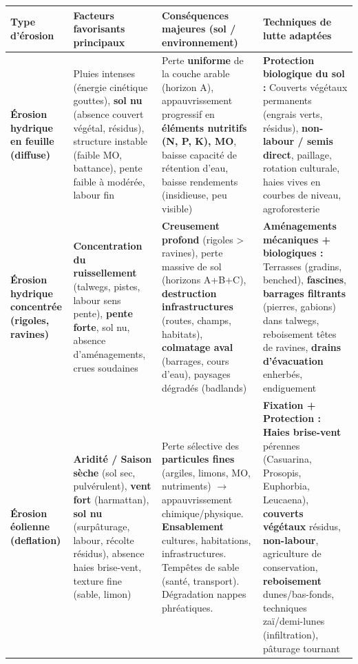 \documentclass[11pt]{article}
\begin{document}
\begin{corrige}
\begin{center}
\begin{tabularx}{\linewidth}{|>{\bfseries}l|X|X|X|}\hline
\textbf{Type d'érosion} & \textbf{Facteurs favorisants principaux} & \textbf{Conséquences majeures (sol / environnement)} & \textbf{Techniques de lutte adaptées} \\ \hline
Érosion hydrique en feuille (diffuse) & Pluies intenses (énergie cinétique gouttes), \textbf{sol nu} (absence couvert végétal, résidus), structure instable (faible MO, battance), pente faible à modérée, labour fin & Perte \textbf{uniforme} de la couche arable (horizon A), appauvrissement progressif en \textbf{éléments nutritifs (N, P, K), MO}, baisse capacité de rétention d'eau, baisse rendements (insidieuse, peu visible) & \textbf{Protection biologique du sol :} Couverts végétaux permanents (engrais verts, résidus), \textbf{non-labour / semis direct}, paillage, rotation culturale, haies vives en courbes de niveau, agroforesterie \\ \hline
Érosion hydrique concentrée (rigoles, ravines) & \textbf{Concentration du ruissellement} (talwegs, pistes, labour sens pente), \textbf{pente forte}, sol nu, absence d'aménagements, crues soudaines & \textbf{Creusement profond} (rigoles > ravines), perte massive de sol (horizons A+B+C), \textbf{destruction infrastructures} (routes, champs, habitats), \textbf{colmatage aval} (barrages, cours d'eau), paysages dégradés (badlands) & \textbf{Aménagements mécaniques + biologiques :} Terrasses (gradins, benched), \textbf{fascines}, \textbf{barrages filtrants} (pierres, gabions) dans talwegs, reboisement têtes de ravines, \textbf{drains d'évacuation} enherbés, endiguement \\ \hline
Érosion éolienne (deflation) & \textbf{Aridité / Saison sèche} (sol sec, pulvérulent), \textbf{vent fort} (harmattan), \textbf{sol nu} (surpâturage, labour, récolte résidus), absence haies brise-vent, texture fine (sable, limon) & Perte sélective des \textbf{particules fines} (argiles, limons, MO, nutriments) $\rightarrow$ appauvrissement chimique/physique. \textbf{Ensablement} cultures, habitations, infrastructures. Tempêtes de sable (santé, transport). Dégradation nappes phréatiques. & \textbf{Fixation + Protection :} \textbf{Haies brise-vent} pérennes (Casuarina, Prosopis, Euphorbia, Leucaena), \textbf{couverts végétaux} résidus, \textbf{non-labour}, agriculture de conservation, \textbf{reboisement} dunes/bas-fonds, techniques zaï/demi-lunes (infiltration), pâturage tournant \\ \hline
\end{tabularx}
\end{center}
\end{corrige}
\end{document}
